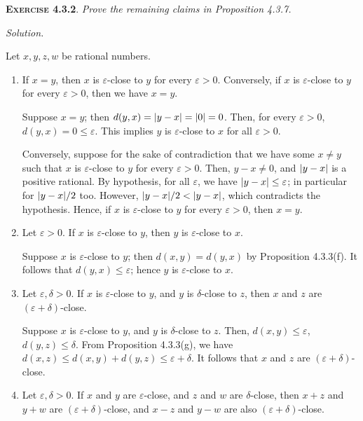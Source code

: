 \documentclass[12pt]{article}
\theoremstyle{remark}
\newenvironment{exer}[2]{
    \noindent \setlength{\parskip}{1em}%
    \textsc{\textbf{Exercise #1}}. \textit{#2} \par
    \noindent \textit{Solution.} %
}{\bigskip}
\begin{document}
\begin{exer}{4.3.2}{
    Prove the remaining claims in Proposition 4.3.7.
}
    Let $x, y, z, w$ be rational numbers.
    \begin{enumerate}[topsep=0mm,label=(\alph*)]
        \item If $x = y$, then $x$ is $\varepsilon$-close to $y$ for every $\varepsilon > 0$.
        Conversely, if $x$ is $\varepsilon$-close to $y$ for every $\varepsilon > 0$, then we have $x = y$.

            Suppose $x = y$; then $d(y, x) = \abs{y - x} = \abs{0} = 0$.
            Then, for every $\varepsilon > 0$, $d(y, x) = 0 \le \varepsilon$.
            This implies $y$ is $\varepsilon$-close to $x$ for all $\varepsilon > 0$.
            
            Conversely, suppose for the sake of contradiction that we have some $x \ne y$ such that $x$ is $\varepsilon$-close to $y$ for every $\varepsilon > 0$.
            Then, $y - x \ne 0$, and $\abs{y - x}$ is a positive rational.
            By hypothesis, for all $\varepsilon$, we have $\abs{y - x} \le \varepsilon$; in particular for $\abs{y - x}/2$ too.
            However, $\abs{y - x}/2 < \abs{y - x}$, which contradicts the hypothesis.
            Hence, if $x$ is $\varepsilon$-close to $y$ for every $\varepsilon > 0$, then $x = y$.

        \item Let $\varepsilon > 0$. If $x$ is $\varepsilon$-close to $y$, then $y$ is $\varepsilon$-close to $x$.

            Suppose $x$ is $\varepsilon$-close to $y$; then $d(x, y) = d(y, x)$ by Proposition 4.3.3(f).
            It follows that $d(y, x) \le \varepsilon$; hence $y$ is $\varepsilon$-close to $x$.

        \item Let $\varepsilon, \delta > 0$. If $x$ is $\varepsilon$-close to $y$, and $y$ is $\delta$-close to $z$, then $x$ and $z$ are $(\varepsilon + \delta)$-close.

            Suppose $x$ is $\varepsilon$-close to $y$, and $y$ is $\delta$-close to $z$.
            Then, $d(x, y) \le \varepsilon$, $d(y, z) \le \delta$.
            From Proposition 4.3.3(g), we have $d(x, z) \le d(x, y) + d(y, z) \le \varepsilon + \delta$.
            It follows that $x$ and $z$ are $(\varepsilon + \delta)$-close.

        \item Let $\varepsilon, \delta > 0$. If $x$ and $y$ are $\varepsilon$-close, and $z$ and $w$ are $\delta$-close, then $x + z$ and $y + w$ are $(\varepsilon + \delta)$-close, and $x - z$ and $y - w$ are also $(\varepsilon + \delta)$-close.


\end{enumerate}
\end{exer}
\end{document}
